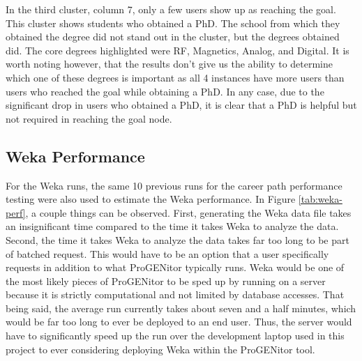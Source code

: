 In the third cluster, column 7, only a few users show up as reaching the goal. 
This cluster shows students who obtained a PhD.  The school from which they
obtained the degree did not stand out in the cluster, but the degrees obtained
did.  The core degrees highlighted were RF, Magnetics, Analog, and Digital.  It
is worth noting however, that the results don't give us the ability to determine
which one of these degrees is important as all 4 instances have more users than
users who reached the goal while obtaining a PhD.  In any case, due to the
significant drop in users who obtained a PhD, it is clear that a PhD is helpful
but not required in reaching the goal node.

\subsection{Weka Performance}
For the Weka runs, the same 10 previous runs for the career path performance
testing were also used to estimate the Weka performance.  In Figure
\ref{tab:weka-perf}, a couple things can be observed.  First, generating the
Weka data file takes an insignificant time compared to the time it takes Weka to
analyze the data.  Second, the time it takes Weka to analyze the data takes far
too long to be part of batched request.  This would have to be an option that a
user specifically requests in addition to what ProGENitor typically runs.  Weka
would be one of the most likely pieces of ProGENitor to be sped up by running on
a server because it is strictly computational and not limited by database
accesses.  That being said, the average run currently takes about seven and a
half minutes, which would be far too long to ever be deployed to an end user. 
Thus, the server would have to significantly speed up the run over the
development laptop used in this project to ever considering deploying Weka
within the ProGENitor tool.

